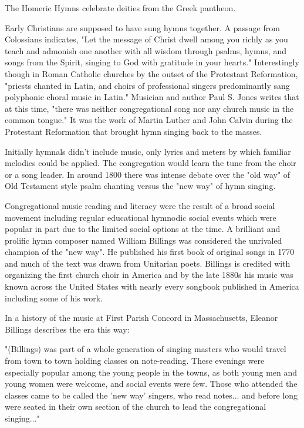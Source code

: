 \documentclass[12pt]{article}
\begin{document}
The Homeric Hymns celebrate deities from the Greek pantheon.

Early Christians are supposed to have sung hymns together. A passage from Colossians indicates, "Let the message of Christ dwell among you richly as you teach and admonish one another with all wisdom through psalms, hymns, and songs from the Spirit, singing to God with gratitude in your hearts." Interestingly though in Roman Catholic churches by the outset of the Protestant Reformation, "priests chanted in Latin, and choirs of professional singers predominantly sang polyphonic choral music in Latin." Musician and author Paul S. Jones writes that at this time, "there was neither congregational song nor any church music in the common tongue." It was the work of Martin Luther and John Calvin during the Protestant Reformation that brought hymn singing back to the masses.

Initially hymnals didn't include music, only lyrics and meters by which familiar melodies could be applied. The congregation would learn the tune from the choir or a song leader. In around 1800 there was intense debate over the "old way" of Old Testament style psalm chanting versus the "new way" of hymn singing.

Congregational music reading and literacy were the result of a broad social movement including regular educational hymnodic social events which were popular in part due to the limited social options at the time. A brilliant and prolific hymn composer named William Billings was considered the unrivaled champion of the "new way". He published his first book of original songs in 1770 and much of the text was drawn from Unitarian poets. Billings is credited with organizing the first church choir in America and by the late 1880s his music was known across the United States with nearly every songbook published in America including some of his work.

In a history of the music at First Parish Concord in Massachusetts, Eleanor Billings describes the era this way:

"(Billings) was part of a whole generation of singing masters who would travel from town to town holding classes on note-reading. These evenings were especially popular among the young people in the towns, as both young men and young women were welcome, and social events were few. Those who attended the classes came to be called the 'new way' singers, who read notes... and before long were seated in their own section of the church to lead the congregational singing..."
\end{document}
